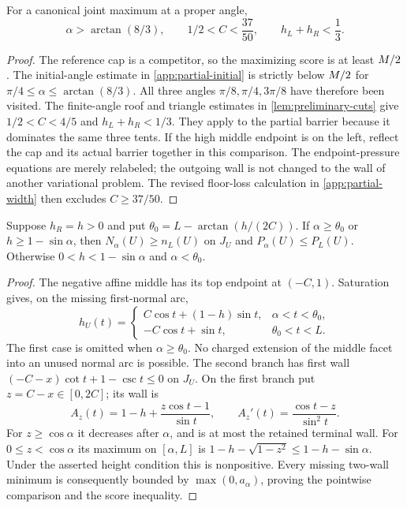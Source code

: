\begin{lemma}\label{lem:partial-cuts}
For a canonical joint maximum at a proper angle,
\[
 \alpha>\arctan(8/3),\qquad
 1/2<C<\frac{37}{50},\qquad
 h_L+h_R<\frac13.
\]
\end{lemma}
\begin{proof}
The reference cap is a competitor, so the maximizing score is at
least $M/2$. The initial-angle estimate in
\cref{app:partial-initial} is strictly below $M/2$ for
$\pi/4\le\alpha\le\arctan(8/3)$. All three angles
$\pi/8,\pi/4,3\pi/8$ have therefore been visited.
The finite-angle roof and triangle estimates in
\cref{lem:preliminary-cuts} give $1/2<C<4/5$ and
$h_L+h_R<1/3$.
They apply to the partial barrier because it dominates the same
three tents. If the high middle endpoint is on the left, reflect
the cap and its actual barrier together in this comparison.
The endpoint-pressure equations are merely relabeled; the outgoing
wall is not changed to the wall of another variational problem.
The revised floor-loss calculation in \cref{app:partial-width}
then excludes $C\ge37/50$.
\end{proof}

\begin{lemma}\label{lem:partial-completion}
Suppose $h_R=h>0$ and put
$\theta_0=L-\arctan(h/(2C))$. If
$\alpha\ge\theta_0$ or $h\ge1-\sin\alpha$, then
$N_\alpha(U)\ge n_L(U)$ on $J_U$ and
$P_\alpha(U)\le P_L(U)$.
Otherwise $0<h<1-\sin\alpha$ and $\alpha<\theta_0$.
\end{lemma}
\begin{proof}
The negative affine middle has its top endpoint at $(-C,1)$.
Saturation gives, on the missing first-normal arc,
\[
 h_U(t)=
 \begin{cases}
 C\cos t+(1-h)\sin t,&\alpha<t<\theta_0,\\
 -C\cos t+\sin t,&\theta_0<t<L.
 \end{cases}
\]
The first case is omitted when $\alpha\ge\theta_0$.
No charged extension of the middle facet into an unused normal arc
is possible. The second branch has first wall
$(-C-x)\cot t+1-\csc t\le0$ on $J_U$.
On the first branch put $z=C-x\in[0,2C]$; its wall is
\[
 A_z(t)=1-h+\frac{z\cos t-1}{\sin t},\qquad
 A_z'(t)=\frac{\cos t-z}{\sin^2t}.
\]
For $z\ge\cos\alpha$ it decreases after $\alpha$, and is at
most the retained terminal wall. For $0\le z<\cos\alpha$ its
maximum on $[\alpha,L]$ is
$1-h-\sqrt{1-z^2}\le1-h-\sin\alpha$.
Under the asserted height condition this is nonpositive. Every
missing two-wall minimum is consequently bounded by
$\max(0,a_\alpha)$, proving the pointwise comparison and the
score inequality.
\end{proof}

